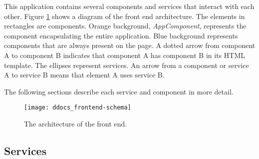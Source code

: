 This application contains several components and services that interact with each other. Figure \ref{fig:frontend-schema} shows a diagram of the front end architecture.
The elements in rectangles are components. Orange background, \emph{AppComponent}, represents the component encapsulating the entire application. Blue
background represents components that are always present on the page. A dotted arrow from component A to component B indicates that component A has component
B in its HTML template. The ellipses represent services. An arrow from a component or service A to service B means that element A uses service B.

The following sections describe each service and component in more detail.

\begin{figure}[!h]
\centering
\texttt{[image: ddocs\_frontend-schema]}
\caption{The architecture of the front end.}
\label{fig:frontend-schema}
\end{figure}

\subsection{Services}


